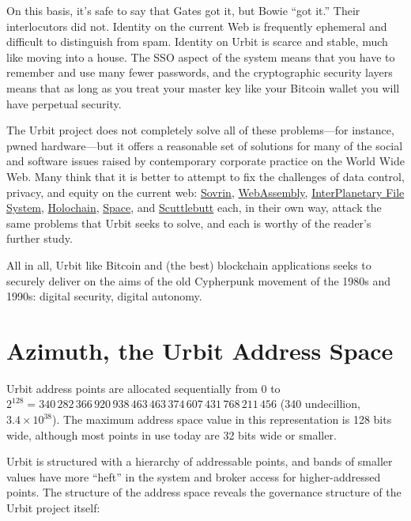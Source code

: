 {{{{On this basis, it's safe to say that Gates got it, but Bowie ``got it.''  Their interlocutors did not.}
Identity on the current Web is frequently ephemeral and difficult to distinguish from spam.  Identity on Urbit is scarce and stable, much like moving into a house.  The SSO aspect of the system means that you have to remember and use many fewer passwords, and the cryptographic security layers means that as long as you treat your master key like your Bitcoin wallet you will have perpetual security.

The Urbit project does not completely solve all of these problems—for instance, pwned hardware—but it offers a reasonable set of solutions for many of the social and software issues raised by contemporary corporate practice on the World Wide Web.  Many think that it is better to attempt to fix the challenges of data control, privacy, and equity on the current web: \href{https://sovrin.org/}{Sovrin}, \href{https://webassembly.org/}{WebAssembly}, \href{https://ipfs.io/}{InterPlanetary File System}, \href{https://holochain.org/}{Holochain}, \href{https://blog.space.storage/posts/Introducing-Space}{Space}, and \href{https://scuttlebutt.nz/}{Scuttlebutt} each, in their own way, attack the same problems that Urbit seeks to solve, and each is worthy of the reader's further study.

All in all, Urbit like Bitcoin and (the best) blockchain applications seeks to securely deliver on the aims of the old Cypherpunk movement of the 1980s and 1990s:  digital security, digital autonomy.


\section{Azimuth, the Urbit Address Space}

Urbit address points are allocated sequentially from $0$ to $2^{128} = 340\,282\,366\,920\,938\,463\,463\,374\,607\,431\,768\,211\,456$ (340 undecillion, $3.4 \times 10^{38}$).  The maximum address space value in this representation is 128 bits wide, although most points in use today are 32 bits wide or smaller.

Urbit is structured with a hierarchy of addressable points, and bands of smaller values have more ``heft'' in the system and broker access for higher-addressed points.  The structure of the address space reveals the governance structure of the Urbit project itself:

}}}
